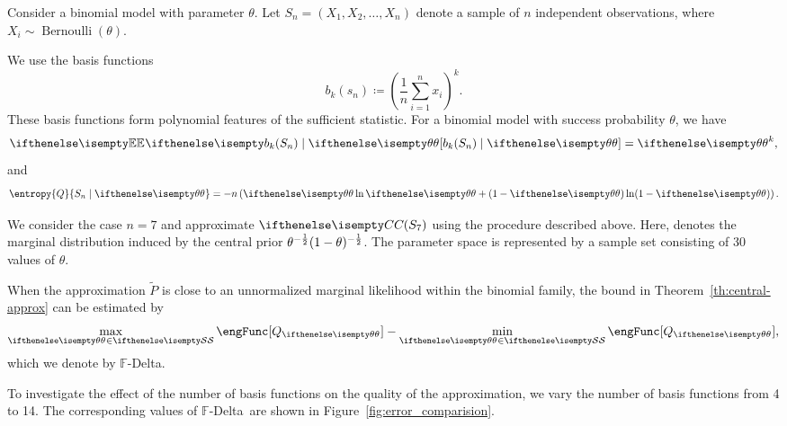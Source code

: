 \newcommand{\Fdelta}{$\mathbb{F}$-Delta}
\newcommand{\PredErr}{Pred-Err}

Consider a binomial model with parameter $\theta$.
Let $S_n = (X_1, X_2, \ldots, X_n)$ denote a sample of $n$ independent observations,
where $X_i \sim \operatorname{Bernoulli}(\theta)$.

We use the basis functions
\[
    b_k(s_n) \coloneqq \left(\frac1n \sum_{i=1}^n x_i \right)^k.
\]
These basis functions form polynomial features of the sufficient statistic.
For a binomial model with success probability $\theta$, we have
\[
    \Ex{}{b_k(S_n) \mid \paramVal} = \paramVal^k,
\]
and
\[
    \entropy{Q}{S_n \mid \paramVal} = -n \left(\paramVal \ln \paramVal + (1 - \paramVal) \ln (1 - \paramVal)  \right).
\]

We consider the case $n=7$ and approximate $\cDist(S_7)$ using the procedure described above.
Here, \cDist denotes the marginal distribution induced by the central prior $\theta^{-\frac{1}{2}}(1 - \theta)^{-\frac{1}{2}}$.
The parameter space is represented by a sample set  consisting of 30 values of $\theta$.

When the approximation $\tilde P$ is close to an unnormalized marginal likelihood within the binomial family,
the bound in Theorem~\ref{th:central-approx} can be estimated by
\[
    \max_{\inSet[\paramVal]{S}} \engFunc[Q_{\paramVal}] - \min_{\inSet[\paramVal]{S}} \engFunc[Q_{\paramVal}],
\]
which we denote by \Fdelta.

To investigate the effect of the number of basis functions on the quality of the approximation, we vary the number
of basis functions from 4 to 14.
The corresponding values of \Fdelta\ are shown in Figure~\ref{fig:error_comparision}.

